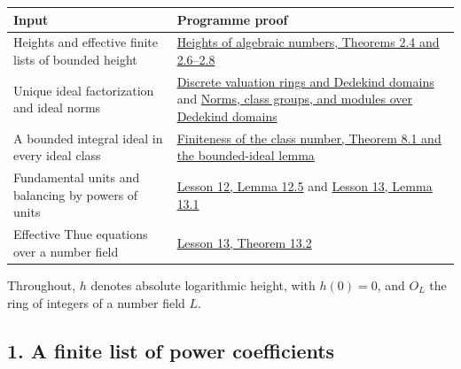 \documentclass[
  11pt,
  a4paper,
]{article}
\newcounter{none} %
\begin{document}
{\def\LTcaptype{none} %
\begin{longtable}[]{@{}
  >{\raggedright\arraybackslash}p{}
  >{\raggedright\arraybackslash}p{}@{}}
\toprule\noalign{}
\begin{minipage}[b]{\linewidth}\raggedright
Input
\end{minipage} & \begin{minipage}[b]{\linewidth}\raggedright
Programme proof
\end{minipage} \\
\midrule\noalign{}
\endhead
\bottomrule\noalign{}
\endlastfoot
Heights and effective finite lists of bounded height &
\href{https://kokunoyumeto.github.io/open-math-courses-public/courses/TR-TRANS/TR-TRANS-02.html}{Heights of algebraic numbers,
Theorems 2.4 and 2.6--2.8} \\
Unique ideal factorization and ideal norms &
\href{https://kokunoyumeto.github.io/open-math-courses-public/courses/NT-ANT/discrete-valuation-rings-and-dedekind-domains.html}{Discrete
valuation rings and Dedekind domains} and
\href{https://kokunoyumeto.github.io/open-math-courses-public/courses/NT-ANT/norms-class-groups-and-modules-over-dedekind-domains.html}{Norms,
class groups, and modules over Dedekind domains} \\
A bounded integral ideal in every ideal class &
\href{https://kokunoyumeto.github.io/open-math-courses-public/courses/NT-ANT/finiteness-of-the-class-number.html}{Finiteness of
the class number, Theorem 8.1 and the bounded-ideal lemma} \\
Fundamental units and balancing by powers of units &
\href{https://kokunoyumeto.github.io/open-math-courses-public/courses/TR-BAKER/TR-BAKER-12.html}{Lesson 12, Lemma 12.5} and
\href{https://kokunoyumeto.github.io/open-math-courses-public/courses/TR-BAKER/TR-BAKER-13.html}{Lesson 13, Lemma 13.1} \\
Effective Thue equations over a number field &
\href{https://kokunoyumeto.github.io/open-math-courses-public/courses/TR-BAKER/TR-BAKER-13.html}{Lesson 13, Theorem 13.2} \\
\end{longtable}
}

Throughout, \(h\) denotes absolute logarithmic height, with \(h(0)=0\),
and \(O_L\) the ring of integers of a number field \(L\).

\subsection{1. A finite list of power
coefficients}\label{a-finite-list-of-power-coefficients}
\end{document}
